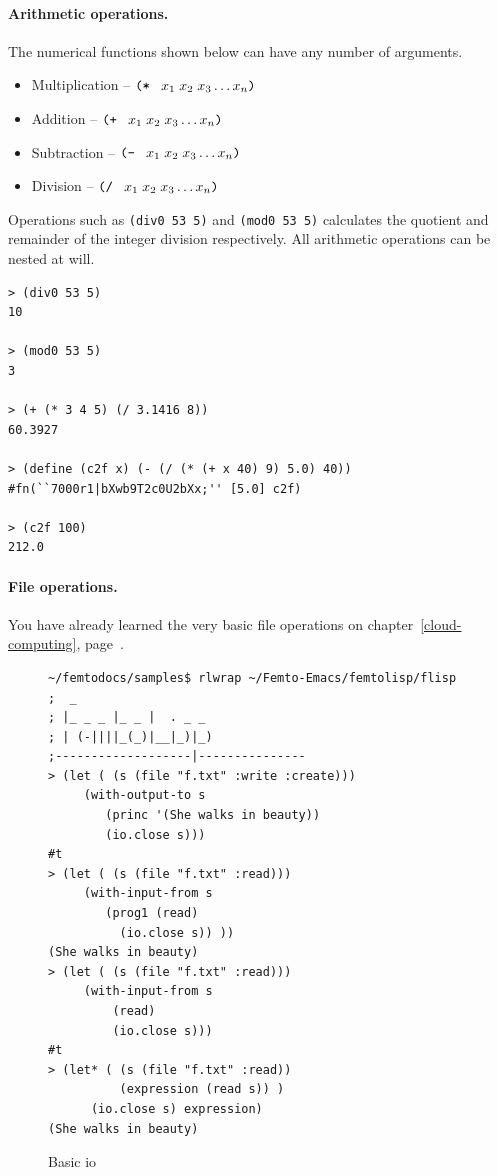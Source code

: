 \documentclass[a4paper,12pt]{book}
\newenvironment{fmpage}[1]
               {\begin{lrbox}{\fmbox}\begin{minipage}{#1}}
               {\end{minipage}\end{lrbox}\fbox{\usebox{\fmbox}}}
\begin{document}
\paragraph{Arithmetic operations.} The numerical functions
shown below can have any number of arguments.
\begin{itemize}
\item Multiplication -- $\verb|(* |\;x_1\; x_2\; x_3\ldots x_n\verb|)|$
\item Addition -- $\verb|(+ |\;x_1\; x_2\; x_3\ldots x_n\verb|)|$
\item Subtraction -- $\verb|(- |\;x_1\; x_2\; x_3\ldots x_n\verb|)|$
\item Division -- $\verb|(/ |\;x_1\; x_2\; x_3\ldots x_n\verb|)|$
\end{itemize}
Operations such as \verb|(div0 53 5)| and \verb|(mod0 53 5)|
calculates the quotient and remainder of the integer
division respectively. All arithmetic operations can
be nested at will.
\begin{Verbatim}[fontsize=\small,
    frame=single]
> (div0 53 5)
10

> (mod0 53 5)
3

> (+ (* 3 4 5) (/ 3.1416 8))
60.3927

> (define (c2f x) (- (/ (* (+ x 40) 9) 5.0) 40))
#fn(``7000r1|bXwb9T2c0U2bXx;'' [5.0] c2f)

> (c2f 100)
212.0
\end{Verbatim}

\paragraph{File operations.}
You have already learned the very basic
file operations on chapter~\ref{cloud-computing},
page~\pageref{cloud-computing}.\\

\begin{figure}[!h]
\begin{fmpage}{0.95\textwidth}
\begin{verbatim}
~/femtodocs/samples$ rlwrap ~/Femto-Emacs/femtolisp/flisp
;  _
; |_ _ _ |_ _ |  . _ _
; | (-||||_(_)|__|_)|_)
;-------------------|---------------
> (let ( (s (file "f.txt" :write :create)))
     (with-output-to s
        (princ '(She walks in beauty))
        (io.close s)))
#t
> (let ( (s (file "f.txt" :read)))
     (with-input-from s
        (prog1 (read)
          (io.close s)) ))
(She walks in beauty)
> (let ( (s (file "f.txt" :read)))
     (with-input-from s
         (read)
         (io.close s)))
#t
> (let* ( (s (file "f.txt" :read))
          (expression (read s)) )
      (io.close s) expression)
(She walks in beauty)
\end{verbatim}
\end{fmpage}
\caption{Basic io}
\label{basicio}
\end{figure}
\end{document}
